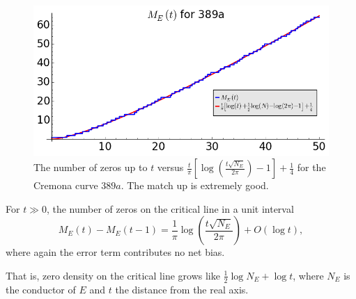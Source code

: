 \begin{figure}[!h]
    \centering
    \includegraphics[width=1.0\textwidth]{graphics/M_E_389.png}
    \caption{The number of zeros up to $t$ versus $\frac{t}{\pi}\left[\log\left(\frac{t\sqrt{N_E}}{2\pi}\right) -1 \right] + \frac{1}{4}$ for the Cremona curve $389a$. The match up is extremely good.}
    \label{fig:M_E_389}
\end{figure}

\begin{corollary}[GRH]
For $t\gg0$, the number of zeros on the critical line in a unit interval
\begin{equation}
M_E(t)-M_E(t-1) = \frac{1}{\pi}\log\left(\frac{t\sqrt{N_E}}{2\pi}\right) + O(\log t),
\end{equation}
where again the error term contributes no net bias.
\end{corollary}

That is, zero density on the critical line grows like $\frac{1}{2}\log N_E + \log t$, where $N_E$ is the conductor of $E$ and $t$ the distance from the real axis. \\

